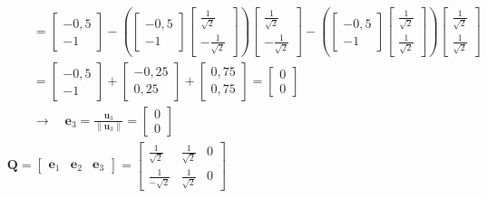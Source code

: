 \documentclass[fleqn]{article}
\begin{document}
\begin{align*}
	&\qquad=\begin{bmatrix}-0,5\\-1\end{bmatrix}-\left(\begin{bmatrix}-0,5\\-1\end{bmatrix}\begin{bmatrix}\frac{1}{\sqrt{2}}\\-\frac{1}{\sqrt{2}}\end{bmatrix}\right)\begin{bmatrix}\frac{1}{\sqrt{2}}\\-\frac{1}{\sqrt{2}}\end{bmatrix}-\left(\begin{bmatrix}-0,5\\-1\end{bmatrix}\begin{bmatrix}\frac{1}{\sqrt{2}}\\\frac{1}{\sqrt{2}}\end{bmatrix}\right)\begin{bmatrix}\frac{1}{\sqrt{2}}\\\frac{1}{\sqrt{2}}\end{bmatrix}& \\
	&\qquad=\begin{bmatrix}-0,5\\-1\end{bmatrix}+\begin{bmatrix}-0,25\\0,25\end{bmatrix}+\begin{bmatrix}0,75\\0,75\end{bmatrix}=\begin{bmatrix}0\\0\end{bmatrix}& \\
	&\qquad\rightarrow\quad\mathbf{e}_{3}=\frac{\mathbf{u}_{3}}{\|\mathbf{u}_{3}\|}=\begin{bmatrix}0\\0\end{bmatrix}& \\
	&\mathbf{Q}=\begin{bmatrix}\mathbf{e}_{1}&\mathbf{e}_{2}&\mathbf{e}_{3}\end{bmatrix}=
	\begin{bmatrix}
	\frac{1}{\sqrt{2}} & \frac{1}{\sqrt{2}} & 0 \\
	\frac{1}{-\sqrt{2}} & \frac{1}{\sqrt{2}} & 0

\end{bmatrix}
\end{align*}
\end{document}
